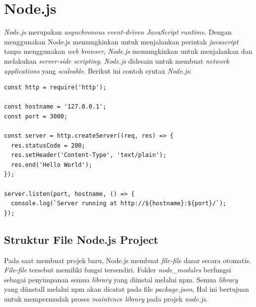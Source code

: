 













\section{Node.js}
\label{sec:nodejs}
\textit{Node.js} merupakan \textit{asynchronous event-driven JavaScript runtime}. Dengan menggunakan Node.js memungkinkan untuk menjalankan perintah \textit{javascript} tanpa menggunakan \textit{web browser}, \textit{Node.js} memungkinkan untuk menjalankan dan melakukan \textit{server-side scripting}\cite{Nodejs:01:about}. \textit{Node.js} didesain untuk membuat \textit{network applications} yang \textit{scaleable}. Berikut ini contoh syntax \textit{Node.js}:

\begin{lstlisting}
const http = require('http');

const hostname = '127.0.0.1';
const port = 3000;

const server = http.createServer((req, res) => {
  res.statusCode = 200;
  res.setHeader('Content-Type', 'text/plain');
  res.end('Hello World');
});

server.listen(port, hostname, () => {
  console.log(`Server running at http://${hostname}:${port}/`);
});
\end{lstlisting}


\subsection{Struktur File Node.js Project}
	Pada saat membuat projek baru, Node.js membuat \textit{file-file} dasar secara otomatis. \textit{File-file} tersebut memiliki fungsi tersendiri. Folder \textit{node\_modules} berfungsi sebagai penyimpanan semua \textit{library} yang diinstal melalui npm. Semua \textit{library} yang diinstall melalui npm akan dicatat pada file \textit{package.json}, Hal ini bertujuan untuk mempermudah proses \textit{maintence library} pada projek \textit{node.js}.
	
